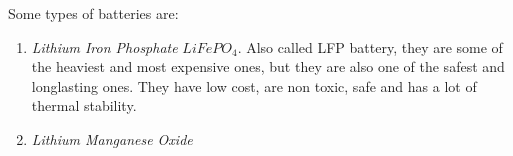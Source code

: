 \documentclass[12pt,a4paper]{article}
\begin{document}
Some types of batteries are:

\begin{enumerate}
\item \textit{Lithium Iron Phosphate} $LiFePO_4$. Also called LFP battery, they are some of the heaviest and most expensive ones, but they are also one of the safest and longlasting ones. They have low cost, are non toxic, safe and has a lot of thermal stability. 
\item \textit{Lithium Manganese Oxide} %
\end{enumerate}
\end{document}
